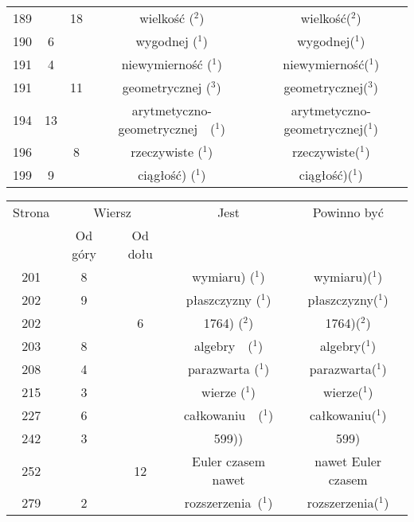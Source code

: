 \documentclass[a4paper,11pt]{article}
\numberwithin{equation}{section}
\begin{document}
\begin{center}
\begin{tabular}{|c|c|c|c|c|}
    189 & & 18 & wielkość ($^{ 2 }$) & wielkość($^{ 2 }$) \\
    190 &  6 & & wygodnej ($^{ 1 }$) & wygodnej($^{ 1 }$) \\
    191 &  4 & & niewymierność ($^{ 1 }$) & niewymierność($^{ 1 }$) \\
    191 & & 11 & geometrycznej ($^{ 3 }$) & geometrycznej($^{ 3 }$) \\
    194 & 13 & & arytmetyczno-geometrycznej~~($^{ 1 }$)
           & arytmetyczno-geometrycznej($^{ 1 }$) \\
    196 & &  8 & rzeczywiste ($^{ 1 }$) & rzeczywiste($^{ 1 }$) \\
    199 &  9 & & ciągłość) ($^{ 1 }$) & ciągłość)($^{ 1 }$) \\
    \hline
  \end{tabular}





  \newpage

  \begin{tabular}{|c|c|c|c|c|}
    \hline
    Strona & \multicolumn{2}{c|}{Wiersz} & Jest
                              & Powinno być \\ \cline{2-3}
    & Od góry & Od dołu & & \\
    \hline
    201 &  8 & & wymiaru) ($^{ 1 }$) & wymiaru)($^{ 1 }$) \\
    202 &  9 & & płaszczyzny ($^{ 1 }$) & płaszczyzny($^{ 1 }$) \\
    202 & &  6 & 1764) ($^{ 2 }$) & 1764)($^{ 2 }$) \\
    203 &  8 & & algebry~~($^{ 1 }$) & algebry($^{ 1 }$) \\
    208 &  4 & & parazwarta ($^{ 1 }$) & parazwarta($^{ 1 }$) \\
    215 &  3 & & wierze ($^{ 1 }$) & wierze($^{ 1 }$) \\
    227 &  6 & & całkowaniu~~($^{ 1 }$) & całkowaniu($^{ 1 }$) \\
    242 &  3 & & 599)) & 599) \\
    252 & & 12 & Euler czasem nawet & nawet Euler czasem \\
    279 &  2 & & rozszerzenia~($^{ 1 }$) & rozszerzenia($^{ 1 }$) \\
    \hline
  \end{tabular}

\end{center}
\end{document}
